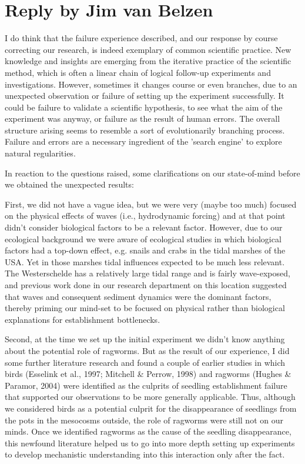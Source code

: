 \documentclass[authordate, empirical]{jote-new-article}
\begin{document}
	\section{Reply by Jim van Belzen}



	I do think that the failure experience described, and our response by course correcting our research, is indeed exemplary of common scientific practice. New knowledge and insights are emerging from the iterative practice of the scientific method, which is often a linear chain of logical follow-up experiments and investigations. However, sometimes it changes course or even branches, due to an unexpected observation or failure of setting up the experiment successfully. It could be failure to validate a scientific hypothesis, to see what the aim of the experiment was anyway, or failure as the result of human errors. The overall structure arising seems to resemble a sort of evolutionarily branching process. Failure and errors are a necessary ingredient of the 'search engine' to explore natural regularities.



	In reaction to the questions raised, some clarifications on our state-of-mind before we obtained the unexpected results:



	First, we did not have a vague idea, but we were very (maybe too much) focused on the physical effects of waves (i.e., hydrodynamic forcing) and at that point didn't consider biological factors to be a relevant factor. However, due to our ecological background we were aware of ecological studies in which biological factors had a top-down effect, e.g. snails and crabs in the tidal marshes of the USA. Yet in those marshes tidal influences expected to be much less relevant. The Westerschelde has a relatively large tidal range and is fairly wave-exposed, and previous work done in our research department on this location suggested that waves and consequent sediment dynamics were the dominant factors, thereby priming our mind-set to be focused on physical rather than biological explanations for establishment bottlenecks.



	Second, at the time we set up the initial experiment we didn't know anything about the potential role of ragworms. But as the result of our experience, I did some further literature research and found a couple of earlier studies in which birds (Esselink et al., 1997; Mitchell \& Perrow, 1998) and ragworms (Hughes \& Paramor, 2004) were identified as the culprits of seedling establishment failure that supported our observations to be more generally applicable. Thus, although we considered birds as a potential culprit for the disappearance of seedlings from the pots in the mesocosms outside, the role of ragworms were still not on our minds. Once we identified ragworms as the cause of the seedling disappearance, this newfound literature helped us to go into more depth setting up experiments to develop mechanistic understanding into this interaction only after the fact.
\end{document}
